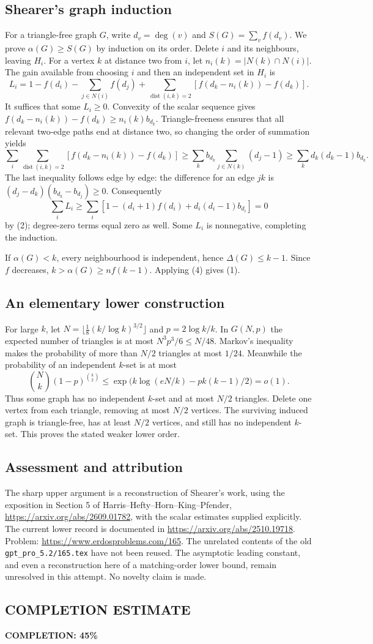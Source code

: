 \subsection*{Shearer's graph induction}
For a triangle-free graph $G$, write $d_v=\deg(v)$ and
$S(G)=\sum_v f(d_v)$. We prove $\alpha(G)\ge S(G)$ by induction on its order.
Delete $i$ and its neighbours, leaving $H_i$. For a vertex $k$ at distance two from $i$, let
$n_i(k)=|N(k)\cap N(i)|$. The gain available from choosing $i$ and then an independent set in $H_i$ is
\[
 L_i=1-f(d_i)-\sum_{j\in N(i)}f(d_j)
 +\sum_{\operatorname{dist}(i,k)=2}
       [f(d_k-n_i(k))-f(d_k)].
\]
It suffices that some $L_i\ge0$. Convexity of the scalar sequence gives
$f(d_k-n_i(k))-f(d_k)\ge n_i(k)b_{d_k}$.
Triangle-freeness ensures that all relevant two-edge paths end at distance two, so changing the order of summation yields
\[
 \sum_i\sum_{\operatorname{dist}(i,k)=2}
 [f(d_k-n_i(k))-f(d_k)]
 \ge\sum_k b_{d_k}\sum_{j\in N(k)}(d_j-1)
 \ge\sum_k d_k(d_k-1)b_{d_k}.
\]
The last inequality follows edge by edge: the difference for an edge $jk$ is
$(d_j-d_k)(b_{d_k}-b_{d_j})\ge0$.
Consequently
\[
 \sum_i L_i\ge
 \sum_i[1-(d_i+1)f(d_i)+d_i(d_i-1)b_{d_i}]=0
\]
by (2); degree-zero terms equal zero as well. Some $L_i$ is nonnegative, completing the induction.

If $\alpha(G)<k$, every neighbourhood is independent, hence $\Delta(G)\le k-1$. Since $f$ decreases,
$k>\alpha(G)\ge n f(k-1)$. Applying (4) gives (1).

\subsection*{An elementary lower construction}
For large $k$, let
$N=\lfloor\frac18(k/\log k)^{3/2}\rfloor$ and $p=2\log k/k$.
In $G(N,p)$ the expected number of triangles is at most
$N^3p^3/6\le N/48$. Markov's inequality makes the probability of more than $N/2$ triangles at most $1/24$.
Meanwhile the probability of an independent $k$-set is at most
\[
 \binom Nk(1-p)^{\binom k2}
 \le\exp\bigl(k\log(eN/k)-p k(k-1)/2\bigr)=o(1).
\]
Thus some graph has no independent $k$-set and at most $N/2$ triangles. Delete one vertex from each triangle, removing at most $N/2$ vertices. The surviving induced graph is triangle-free, has at least $N/2$ vertices, and still has no independent $k$-set. This proves the stated weaker lower order.

\subsection*{Assessment and attribution}
The sharp upper argument is a reconstruction of Shearer's work, using the exposition in Section 5 of Harris--Hefty--Horn--King--Pfender, \url{https://arxiv.org/abs/2609.01782}, with the scalar estimates supplied explicitly. The current lower record is documented in \url{https://arxiv.org/abs/2510.19718}. Problem: \url{https://www.erdosproblems.com/165}. The unrelated contents of the old \texttt{gpt\_pro\_5.2/165.tex} have not been reused.
The asymptotic leading constant, and even a reconstruction here of a matching-order lower bound, remain unresolved in this attempt. No novelty claim is made.
\subsection*{COMPLETION ESTIMATE}
\textbf{COMPLETION: 45\%}
